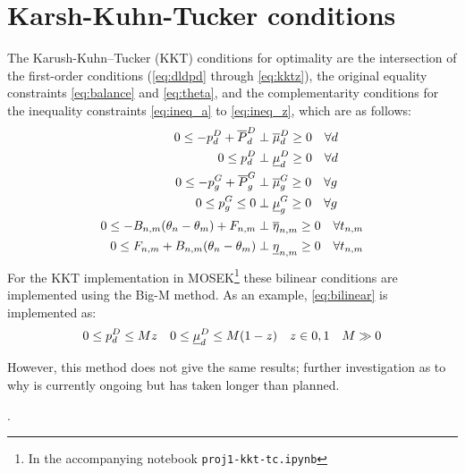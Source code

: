 \documentclass[11pt,a4paper]{article}
\numberwithin{equation}{section}
\begin{document}
\section{Karsh-Kuhn-Tucker conditions}
\label{sec:kkt}
The Karush-Kuhn–Tucker (KKT) conditions for optimality are the intersection of the first-order conditions (\cref{eq:dldpd} through \cref{eq:kktz}), the original equality constraints \cref{eq:balance} and \cref{eq:theta}, and the complementarity conditions for the inequality constraints \cref{eq:ineq_a} to \cref{eq:ineq_z}, which are as follows:
\begin{align}
0 \leq - p^D_d + \overline{P}^D_d &\perp \overline{\mu}_d^D \geq 0 \quad \forall d  \\
0 \leq p^D_d &\perp \underline{\mu}_d^D \geq 0 \quad \forall d  \label{eq:bilinear} \\
0 \leq - p^G_g + \overline{P}^G_g &\perp \overline{\mu}_g^G \geq 0 \quad \forall g  \\
0 \leq p^G_g \leq 0 &\perp \underline{\mu}_g^G \geq 0 \quad \forall g  \\
0 \leq - B_{n,m}(\theta_n - \theta_m) + F_{n,m} &\perp \overline{\eta}_{n,m} \geq 0 \quad \forall t_{n,m} \\
0 \leq F_{n,m} + B_{n,m}(\theta_n - \theta_m) &\perp \underline{\eta}_{n,m} \geq 0 \quad \forall t_{n,m}
\end{align}
For the KKT implementation in MOSEK\footnote{
In the accompanying notebook \texttt{proj1-kkt-tc.ipynb}
} these bilinear conditions are implemented using the Big-M method.
As an example, \cref{eq:bilinear} is implemented as:
\begin{align}
0 \leq p^D_d &\leq  M z & 0 \leq \underline{\mu}_d^D &\leq  M (1-z) & z &\in {0, 1}  & M \gg 0
\end{align}

However, this method does not give the same results; further investigation as to why is currently ongoing but has taken longer than planned. 

\renewcommand{\refname}{\section{References}}.

\end{document}
